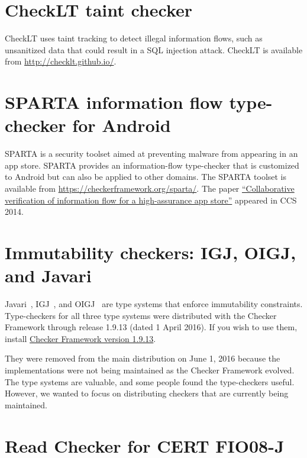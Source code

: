 \section{CheckLT taint checker\label{checklt-checker}}

CheckLT uses taint tracking to detect illegal information flows, such as
unsanitized data that could result in a SQL injection attack.
CheckLT is available from \url{http://checklt.github.io/}.


\section{SPARTA information flow type-checker for Android\label{sparta-checker}}

SPARTA is a security toolset aimed at preventing malware from appearing in
an app store.  SPARTA provides an information-flow type-checker that is
customized to Android but can also be applied to other domains.
The SPARTA toolset is available from
\url{https://checkerframework.org/sparta/}.
The paper
\href{https://homes.cs.washington.edu/~mernst/pubs/infoflow-ccs2014.pdf}{``Collaborative
    verification of information flow for a high-assurance app store''}
  appeared in CCS 2014.


\section{Immutability checkers:  IGJ, OIGJ, and Javari\label{igj-checker}\label{javari-checker}}

Javari~\cite{TschantzE2005}, IGJ~\cite{ZibinPAAKE2007}, and
OIGJ~\cite{ZibinPLAE2010} are type systems that enforce immutability
constraints.  Type-checkers for all three type systems were distributed
with the Checker Framework through release 1.9.13 (dated 1 April 2016).
If you wish to use them, install
\href{https://checkerframework.org/releases/1.9.13/}{Checker
  Framework version 1.9.13}.

They were removed from the main distribution on June 1, 2016 because the
implementations were not being maintained as the Checker Framework evolved.
The type systems are valuable, and some people found the type-checkers
useful.  However,
we wanted
to focus on distributing checkers that are currently being maintained.


\section{Read Checker for CERT FIO08-J\label{read-checker}}

